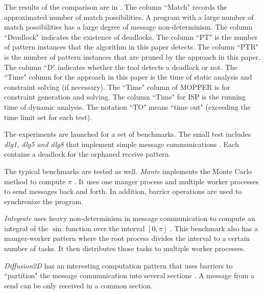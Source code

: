 The results of the comparison are in . The column ``Match" records the approximated number of match possibilities. A program with a large number of match possibilities has a large degree of message non-determinism. The column ``Deadlock" indicates the existence of deadlocks. The column ``PT" is the number of pattern instances that the algorithm in this paper detects. The column ``PTR" is the number of pattern instances that are pruned by the approach in this paper. The column ``D" indicates whether the tool detects a deadlock or not. The ``Time" column for the approach in this paper is the time of static analysis and constraint solving (if necessary). The ``Time" column of MOPPER is for constraint generation and solving. The column ``Time" for ISP is the running time of dynamic analysis. The notation ``TO" means ``time out" (exceeding the time limit set for each test).

 
The experiments are launched for a set of benchmarks. The small test includes \textit{dlg1, dlg5 and dlg8} that implement simple message communications \cite{DBLP:conf/fm/ForejtKNS14}. Each contains a deadlock for the orphaned receive pattern.  

The typical benchmarks are tested as well. \textit{Monte} implements the Monte Carlo method to compute $\pi$ \cite{benchmark:mentoCarlo}. It uses one manger process and multiple worker processes to send messages back and forth. In addition, barrier operations are used to synchronize the program. 

\textit{Integrate} uses heavy non-determinism in message communication to compute an integral of the $\sin$ function over the interval $[0, \pi]$ \cite{benchmark:fevs}. This benchmark also has a manger-worker pattern where the root process divides the interval to a certain number of tasks. It then distributes those tasks to multiple worker processes. 

 
\textit{Diffusion2D} has an interesting computation pattern that uses barriers to ``partition" the message communication into several sections \cite{benchmark:fevs}. A message from a send can be only received in a common section. 

